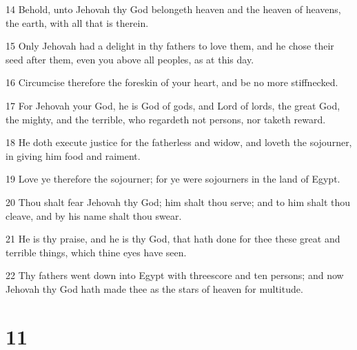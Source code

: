 \par 14 Behold, unto Jehovah thy God belongeth heaven and the heaven of heavens, the earth, with all that is therein.
\par 15 Only Jehovah had a delight in thy fathers to love them, and he chose their seed after them, even you above all peoples, as at this day.
\par 16 Circumcise therefore the foreskin of your heart, and be no more stiffnecked.
\par 17 For Jehovah your God, he is God of gods, and Lord of lords, the great God, the mighty, and the terrible, who regardeth not persons, nor taketh reward.
\par 18 He doth execute justice for the fatherless and widow, and loveth the sojourner, in giving him food and raiment.
\par 19 Love ye therefore the sojourner; for ye were sojourners in the land of Egypt.
\par 20 Thou shalt fear Jehovah thy God; him shalt thou serve; and to him shalt thou cleave, and by his name shalt thou swear.
\par 21 He is thy praise, and he is thy God, that hath done for thee these great and terrible things, which thine eyes have seen.
\par 22 Thy fathers went down into Egypt with threescore and ten persons; and now Jehovah thy God hath made thee as the stars of heaven for multitude.

\chapter{11}

